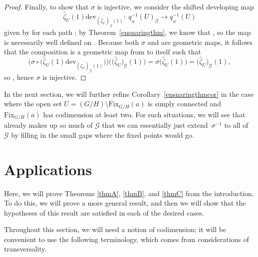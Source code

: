 \documentclass[pdftex]{sigma}
\numberwithin{equation}{section}
\theoremstyle{definition}
\DeclareMathOperator{\Hol}{\mathrm{Hol}}
\DeclareMathOperator{\Path}{Path}
\begin{document}
\begin{proof}
Finally, to show that $\sigma$ is injective, we consider the shifted developing map \[\hat{\zeta}_U(1)\mathrm{dev}_{(\hat{\zeta}_U)_\mathscr{G}(1)}\colon \ q_{{}_H}^{-1}(U)_\mathscr{G}\to q_{{}_H}^{-1}(U)\] given by  for each path \smash{$\gamma\in\Path_{(\hat{\zeta}_U)_\mathscr{G}(1)}\bigl(q_{{}_H}^{-1}(U)_\mathscr{G}\bigr)$}; by Theorem~\ref{ensnaringthm}, we know that \smash{$\Hol_{(\hat{\zeta}_U)_\mathscr{G}(1)}\bigl(q_{{}_H}^{-1}(U)_\mathscr{G},\omega\bigr)=\{e\}$}, so the map  is necessarily well defined on . Because both $\sigma$ and  are geometric maps, it follows that the composition  is a geometric map from  to itself such that \[\bigl(\sigma\circ\bigl(\hat{\zeta}_U(1)\mathrm{dev}_{(\hat{\zeta}_U)_\mathscr{G}(1)}\bigr)\bigr) \bigl(\bigl(\hat{\zeta}_U\bigr)_\mathscr{G}(1)\bigr)=\sigma\bigl(\hat{\zeta}_U(1)\bigr) =\bigl(\hat{\zeta}_U\bigr)_\mathscr{G}(1),\] so , hence $\sigma$ is injective. \end{proof}

In the next section, we will further refine Corollary~\ref{ensnaringthmcor} in the case where the open set $U=(G/H)\setminus\mathrm{Fix}_{G/H}(a)$ is simply connected and $\mathrm{Fix}_{G/H}(a)$ has codimension at least two. For such situations, we will see that  already makes up so much of $\mathscr{G}$ that we can essentially just extend~$\sigma^{-1}$ to all of~$\mathscr{G}$ by filling in the small gaps where the fixed points would go.

\section{Applications}\label{applications}
Here, we will prove Theorems \ref{thmA}, \ref{thmB}, and \ref{thmC} from the introduction. To do this, we will prove a more general result, and then we will show that the hypotheses of this result are satisfied in each of the desired cases.

Throughout this section, we will need a notion of codimension; it will be convenient to use the following terminology, which comes from considerations of transversality.
\end{document}
